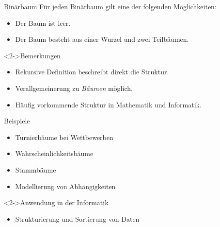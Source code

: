 \begin{frame}
    \begin{defblock}{Binärbaum}
        Für jeden Binärbaum gilt eine der folgenden Möglichkeiten:
        \begin{itemize}
            \item Der Baum ist leer.
            \item Der Baum besteht aus einer Wurzel und zwei Teil\alert{bäume}n.
        \end{itemize}
    \end{defblock}
    \begin{block}<2->{Bemerkungen}
        \begin{itemize}
            \item Rekursive Definition beschreibt direkt die Struktur.
            \item Verallgemeinerung zu \emph{Bäumen} möglich.
            \item Häufig vorkommende Struktur in Mathematik und Informatik.
        \end{itemize}
    \end{block}
\end{frame}

\begin{frame}
    \begin{block}{Beispiele}
        \begin{itemize}
            \item Turnierbäume bei Wettbewerben
            \item Wahrscheinlichkeitsbäume
            \item Stammbäume
            \item Modellierung von Abhängigkeiten
        \end{itemize}
    \end{block}
    \begin{block}<2->{Anwendung in der Informatik}
        \begin{itemize}
            \item Strukturierung und Sortierung von Daten
        \end{itemize}
    \end{block}
\end{frame}

